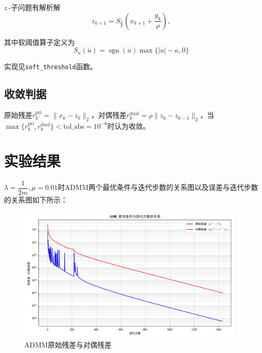 \documentclass[cn,hazy,black,11pt,normal]{elegantnote}
\DeclareMathOperator*{\sgn}{sgn}
\begin{document}
                $z\,$-子问题有解析解\[z_{k+1}=S_{\frac{\mu}{\rho}}\left(x_{k+1}+\dfrac{y_k}{\rho}\right),\]

                其中软阈值算子定义为\[S_{\kappa}(u)=\sgn(u)\max\{|u|-\kappa,0\}\]

                实现见\texttt{soft\_threshold}函数。

        \subsection{收敛判据}

            原始残差$r_k^{\text{pri}}=\|x_k-z_k\|_2$，对偶残差$r_k^{\text{dual}}=\rho\|z_k-z_{k-1}\|_2$，当$\max\{r_k^{\text{pri}},r_k^{\text{dual}}\}<\text{tol\_abs}=10^{-6}$时认为收敛。



    \section{实验结果}

        $\lambda=\dfrac1{2m},\mu=0.01$时ADMM两个最优条件与迭代步数的关系图以及误差与迭代步数的关系图如下所示：

        \begin{figure}[H]
            \centering
            \includegraphics[width=0.98\textwidth]{image/admm_residuals_cn}
            \caption{ADMM原始残差与对偶残差}
            \label{fig:admm_residuals}
        \end{figure}
\end{document}
